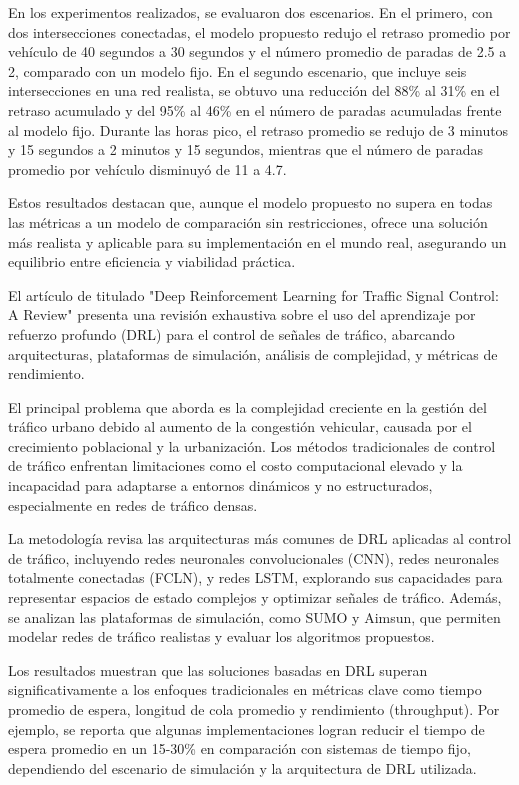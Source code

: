 En los experimentos realizados, se evaluaron dos escenarios. En el primero, con dos intersecciones conectadas, el modelo propuesto redujo el retraso promedio por vehículo de 40 segundos a 30 segundos y el número promedio de paradas de 2.5 a 2, comparado con un modelo fijo. En el segundo escenario, que incluye seis intersecciones en una red realista, se obtuvo una reducción del 88\% al 31\% en el retraso acumulado y del 95\% al 46\% en el número de paradas acumuladas frente al modelo fijo. Durante las horas pico, el retraso promedio se redujo de 3 minutos y 15 segundos a 2 minutos y 15 segundos, mientras que el número de paradas promedio por vehículo disminuyó de 11 a 4.7.

Estos resultados destacan que, aunque el modelo propuesto no supera en todas las métricas a un modelo de comparación sin restricciones, ofrece una solución más realista y aplicable para su implementación en el mundo real, asegurando un equilibrio entre eficiencia y viabilidad práctica.

El artículo de \cite{Rasheed2020} titulado "Deep Reinforcement Learning for Traffic Signal Control: A Review" presenta una revisión exhaustiva sobre el uso del aprendizaje por refuerzo profundo (DRL) para el control de señales de tráfico, abarcando arquitecturas, plataformas de simulación, análisis de complejidad, y métricas de rendimiento.

El principal problema que aborda es la complejidad creciente en la gestión del tráfico urbano debido al aumento de la congestión vehicular, causada por el crecimiento poblacional y la urbanización. Los métodos tradicionales de control de tráfico enfrentan limitaciones como el costo computacional elevado y la incapacidad para adaptarse a entornos dinámicos y no estructurados, especialmente en redes de tráfico densas.

La metodología revisa las arquitecturas más comunes de DRL aplicadas al control de tráfico, incluyendo redes neuronales convolucionales (CNN), redes neuronales totalmente conectadas (FCLN), y redes LSTM, explorando sus capacidades para representar espacios de estado complejos y optimizar señales de tráfico. Además, se analizan las plataformas de simulación, como SUMO y Aimsun, que permiten modelar redes de tráfico realistas y evaluar los algoritmos propuestos.

Los resultados muestran que las soluciones basadas en DRL superan significativamente a los enfoques tradicionales en métricas clave como tiempo promedio de espera, longitud de cola promedio y rendimiento (throughput). Por ejemplo, se reporta que algunas implementaciones logran reducir el tiempo de espera promedio en un 15-30\% en comparación con sistemas de tiempo fijo, dependiendo del escenario de simulación y la arquitectura de DRL utilizada.


